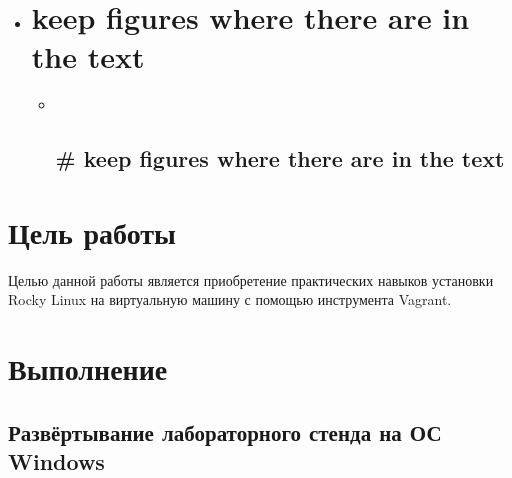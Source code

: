 \begin{itemize}
\item
  \usepackage{float}

  \section{keep figures where there are in the
  text}\label{keep-figures-where-there-are-in-the-text}

  \begin{itemize}
  \item ~
    \subsection{\texorpdfstring{ \# keep
    figures where there are in the
    text}{ \# keep figures where there are in the text}}\label{keep-figures-where-there-are-in-the-text-1}
  \end{itemize}
\end{itemize}

\section{Цель
работы}\label{ux446ux435ux43bux44c-ux440ux430ux431ux43eux442ux44b}

Целью данной работы является приобретение практических навыков установки
Rocky Linux на виртуальную машину с помощью инструмента Vagrant.

\section{Выполнение}\label{ux432ux44bux43fux43eux43bux43dux435ux43dux438ux435}

\subsection{Развёртывание лабораторного стенда на ОС
Windows}\label{ux440ux430ux437ux432ux451ux440ux442ux44bux432ux430ux43dux438ux435-ux43bux430ux431ux43eux440ux430ux442ux43eux440ux43dux43eux433ux43e-ux441ux442ux435ux43dux434ux430-ux43dux430-ux43eux441-windows}

